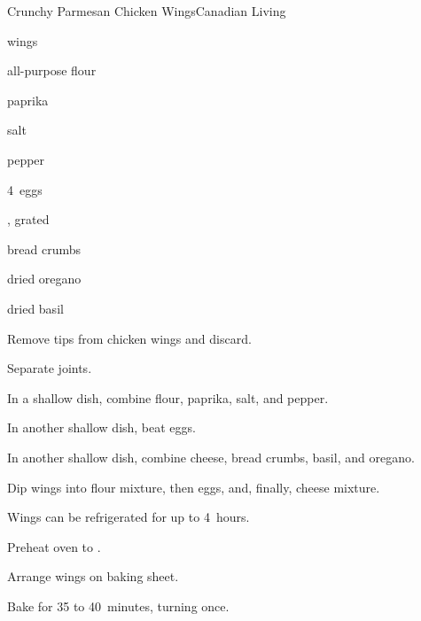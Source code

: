 \begin{recipe}{Crunchy Parmesan Chicken Wings}{Canadian Living}{}

\begin{ingredients}
\item {}  wings
\item \C{\half} all-purpose flour
\item \tp{\half} paprika
\item \tp{\quarter} salt
\item \tp{\quarter} pepper
\item 4~eggs
\item {} , grated
\item \C{\half} bread crumbs
\item {} dried oregano
\item {} dried basil
\end{ingredients}

\begin{directions}
\item Remove tips from chicken wings and discard.
\item Separate joints.
\item In a shallow dish, combine flour, paprika, salt, and pepper.
\item In another shallow dish, beat eggs.
\item In another shallow dish, combine cheese, bread crumbs, basil, and oregano.
\item Dip wings into flour mixture, then eggs, and, finally, cheese mixture.
\item Wings can be refrigerated for up to 4~hours.
\item Preheat oven to .
\item Arrange wings on baking sheet.
\item Bake for 35 to 40~minutes, turning once.
\end{directions}

\end{recipe}
